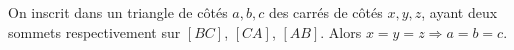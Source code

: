 On inscrit dans un triangle de côtés $a, b, c$ des carrés de côtés $x, y, z$, ayant deux sommets respectivement sur $[BC]$, $[CA]$, $[AB]$. Alors $x = y = z \Rightarrow a = b = c$.
